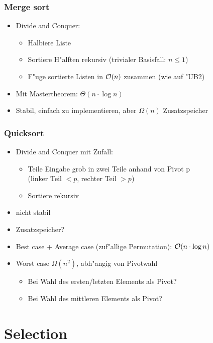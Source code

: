 \begin{frame}
  \frametitle{Merge sort}
  \begin{itemize}
  \item Divide and Conquer:
    \begin{itemize}
    \item Halbiere Liste
    \item Sortiere H"alften rekursiv (trivialer Basisfall: $n \leq 1$)
    \item F"uge sortierte Listen in $\mathcal{O}(n)$ zusammen (wie auf "UB2)
    \end{itemize}
  \item Mit Mastertheorem: $\Theta(n \cdot \log n)$
  \item Stabil, einfach zu implementieren, aber $\Omega(n)$ Zusatzspeicher
  \end{itemize}
\end{frame}

\begin{frame}
  \frametitle{Quicksort}
  \begin{itemize}
  \item Divide and Conquer mit Zufall:
    \begin{itemize}
    \item Teile Eingabe grob in zwei Teile anhand von Pivot p \\
          (linker Teil $< p$, rechter Teil $>p$)
    \item Sortiere rekursiv
    \end{itemize}
  \item nicht stabil
  \item Zusatzspeicher? 
  \item Best case + Average case (zuf"allige Permutation):
          $\mathcal{O}(n \cdot \log n)$
  \item Worst case $\Omega(n^2)$, abh"angig von Pivotwahl
    \begin{itemize}
    \item Bei Wahl des ersten/letzten Elements als Pivot?
    \item Bei Wahl des mittleren Elements als Pivot?
    \end{itemize}
  \end{itemize}
\end{frame}

\section{Selection}
